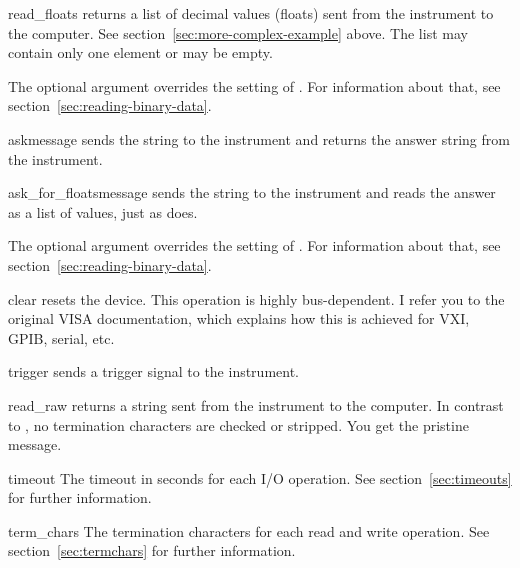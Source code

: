 \documentclass{howto}
\begin{document}
\begin{methoddesc}{read_floats}{}
  returns a list of decimal values (floats) sent from the instrument to the
  computer.  See section~\ref{sec:more-complex-example} above.  The list may
  contain only one element or may be empty.

  The optional  argument overrides the setting of
  .  For information about that, see
  section~\ref{sec:reading-binary-data}.
\end{methoddesc}

\begin{methoddesc}{ask}{message}
  sends the string  to the instrument and returns the answer
  string from the instrument.
\end{methoddesc}

\begin{methoddesc}{ask_for_floats}{message}
  sends the string  to the instrument and reads the answer as a
  list of values, just as  does.

  The optional  argument overrides the setting of
  .  For information about that, see
  section~\ref{sec:reading-binary-data}.
\end{methoddesc}

\begin{methoddesc}{clear}{}
  resets the device.  This operation is highly bus-dependent.  I refer you to
  the original VISA documentation, which explains how this is achieved for VXI,
  GPIB, serial, etc.
\end{methoddesc}

\begin{methoddesc}{trigger}{}
  sends a trigger signal to the instrument.
\end{methoddesc}

\begin{methoddesc}{read_raw}{}
  returns a string sent from the instrument to the computer.  In contrast to
  , no termination characters are checked or stripped.  You get
  the pristine message.
\end{methoddesc}

\begin{memberdesc}{timeout}
  The timeout in seconds for each I/O operation.  See
  section~\ref{sec:timeouts} for further information.
\end{memberdesc}

\begin{memberdesc}{term_chars}
  The termination characters for each read and write operation.  See
  section~\ref{sec:termchars} for further information.
\end{memberdesc}
\end{document}
